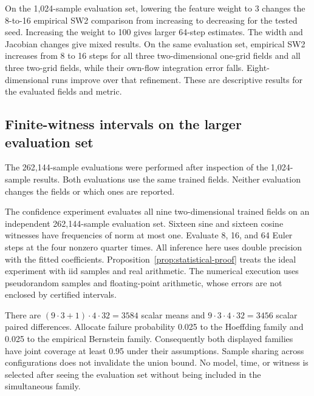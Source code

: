 On the 1,024-sample evaluation set, lowering the feature weight to 3 changes the
8-to-16 empirical SW2 comparison from increasing to decreasing for the
tested seed. Increasing the weight to 100 gives larger 64-step estimates.
The width and Jacobian changes give mixed results. On the same evaluation set,
empirical SW2 increases from 8 to 16
steps for all three two-dimensional one-grid fields and all three
two-grid fields, while their own-flow integration error falls. Eight-dimensional runs improve over that refinement.
These are descriptive results for the evaluated fields and metric.

\subsection{Finite-witness intervals on the larger evaluation set}
\label{app:large-bank-timing}
The 262,144-sample evaluations were performed after inspection of the
1,024-sample results. Both evaluations use the same trained fields. Neither evaluation
changes the fields or which ones are reported.

The confidence experiment evaluates all nine two-dimensional trained fields
on an independent 262,144-sample evaluation set. Sixteen sine and sixteen cosine
witnesses have frequencies of norm at most one. Evaluate 8, 16, and 64 Euler
steps at the four nonzero quarter times. All inference here uses double
precision with the fitted coefficients.
Proposition~\ref{prop:statistical-proof} treats the ideal experiment with iid
samples and real arithmetic. The numerical execution uses pseudorandom
samples and floating-point arithmetic, whose errors are not enclosed by
certified intervals.

There are $(9\cdot3+1)\cdot4\cdot32=3584$ scalar means and
$9\cdot3\cdot4\cdot32=3456$ scalar paired differences. Allocate failure
probability 0.025 to the Hoeffding family and 0.025 to the empirical Bernstein
family. Consequently both displayed families have joint coverage at least
0.95 under their assumptions. Sample sharing across configurations does not
invalidate the union bound. No model, time, or witness is selected after
seeing the evaluation set without being included in the simultaneous family.

